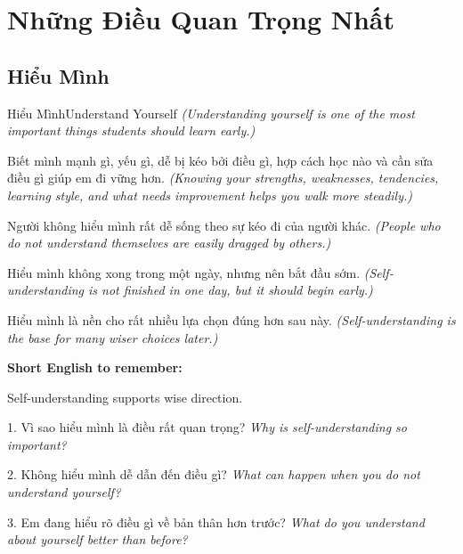 \chapter{Những Điều Quan Trọng Nhất}

\section{Hiểu Mình}
\begin{truyen}{Hiểu Mình}{Understand Yourself}
\textit{(Understanding yourself is one of the most important things students should learn early.)}

Biết mình mạnh gì, yếu gì, dễ bị kéo bởi điều gì, hợp cách học nào và cần sửa điều gì giúp em đi vững hơn.
\textit{(Knowing your strengths, weaknesses, tendencies, learning style, and what needs improvement helps you walk more steadily.)}

Người không hiểu mình rất dễ sống theo sự kéo đi của người khác.
\textit{(People who do not understand themselves are easily dragged by others.)}

Hiểu mình không xong trong một ngày, nhưng nên bắt đầu sớm.
\textit{(Self-understanding is not finished in one day, but it should begin early.)}
\end{truyen}

\begin{baihoc}
Hiểu mình là nền cho rất nhiều lựa chọn đúng hơn sau này.
\textit{(Self-understanding is the base for many wiser choices later.)}
\end{baihoc}

\begin{ghinhoanh}
\textbf{Short English to remember:}

Self-understanding supports wise direction.

\end{ghinhoanh}

\begin{tuhocnhanh}
1. Vì sao hiểu mình là điều rất quan trọng? \textit{Why is self-understanding so important?}

2. Không hiểu mình dễ dẫn đến điều gì? \textit{What can happen when you do not understand yourself?}

3. Em đang hiểu rõ điều gì về bản thân hơn trước? \textit{What do you understand about yourself better than before?}
\end{tuhocnhanh}
\ngancach

